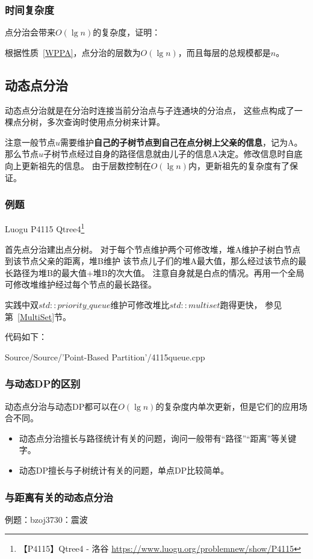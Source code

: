 \subsubsection{时间复杂度}
点分治会带来$O(\lg n)$的复杂度，证明：

根据性质~\ref{WPPA}，点分治的层数为$O(\lg n)$，而且每层的总规模都是$n$。

\subsection{动态点分治}
动态点分治就是在分治时连接当前分治点与子连通块的分治点，
这些点构成了一棵点分树，多次查询时使用点分树来计算。

注意一般节点$u$需要维护{\bfseries 自己的子树节点到自己在点分树上父亲的信息}，记为A。
那么节点$u$子树节点经过自身的路径信息就由儿子的信息A决定。修改信息时自底向上更新祖先的信息。
由于层数控制在$O(\lg n)$内，更新祖先的复杂度有了保证。

\subsubsection{例题}

Luogu P4115 Qtree4\footnote{【P4115】Qtree4 - 洛谷
\url{https://www.luogu.org/problemnew/show/P4115}}

首先点分治建出点分树。
对于每个节点维护两个可修改堆，堆A维护子树白节点到该节点父亲的距离，堆B维护
该节点儿子们的堆A最大值，那么经过该节点的最长路径为堆B的最大值+堆B的次大值。
注意自身就是白点的情况。再用一个全局可修改堆维护经过每个节点的最长路径。

实践中双$std::priority\_queue$维护可修改堆比$std::multiset$跑得更快，
参见第~\ref{MultiSet}节。

代码如下：

{Source/Source/'Point-Based Partition'/4115queue.cpp}
\subsubsection{与动态DP的区别}
动态点分治与动态DP都可以在$O(\lg n)$的复杂度内单次更新，但是它们的应用场合不同。

\begin{itemize}
    \item 动态点分治擅长与路径统计有关的问题，询问一般带有``路径''``距离''等关键字。
    \item 动态DP擅长与子树统计有关的问题，单点DP比较简单。
\end{itemize}

\subsubsection{与距离有关的动态点分治}
例题：bzoj3730：震波

